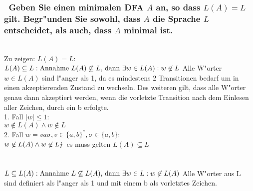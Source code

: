 \documentclass{article}
\newcommand{\gap}{\null\ \\ \\}
\renewcommand{\~}{\sim}
\begin{document}
\subsubsection{\
    Geben Sie einen minimalen DFA $A$ an, so dass $L(A) = L$ gilt. Begr"unden 
        Sie sowohl, dass $A$ die Sprache $L$ entscheidet, als auch, dass $A$ 
        minimal ist.
    }
\\
Zu zeigen: $L(A) = L$:\\$
\\
L(A) \subseteq L:\\
\text{Annahme } L(A) \not \subseteq L \text{, dann } 
    \exists w \in L(A) : w \not \in L\\
\\
$ Alle W"orter $w \in L(A)$ sind l"anger als 1, da es mindestens 2 Transitionen
    bedarf um in einen akzeptierenden Zustand zu wechseln. Des weiteren gilt,
    dass alle W"orter genau dann akzeptiert werden, wenn die vorletzte 
    Transition nach dem Einlesen aller Zeichen, durch ein b erfolgte.\\
1. Fall $|w| \leq 1$:\\
$w \not \in L(A) \land w \not \in L$\\
2. Fall $w = va\sigma, v \in \{a,b\}^*, \sigma \in \{a,b\}$:\\
$w \not \in L(A) \land w \not \in L\\
\lightning$ es muss gelten $L(A) \subseteq L$\\
\gap
$L \subseteq L(A):\\
\text{Annahme } L \not \subseteq L(A) \text{, dann } 
    \exists w \in L : w \not \in L(A)\\
\\
$ Alle W"orter aus L sind definiert als l"anger als 1 und mit einem b als
    vorletztes Zeichen.\\
\end{document}
